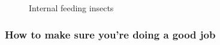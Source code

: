 \documentclass[
  letterpaper,
  DIV=11,
  numbers=noendperiod]{scrreprt}
\begin{document}
\begin{figure}


\caption{\label{fig-internal}Internal feeding insects}

\end{figure}%

\subsubsection{How to make sure you're doing a good
job}\label{how-to-make-sure-youre-doing-a-good-job}
\end{document}
